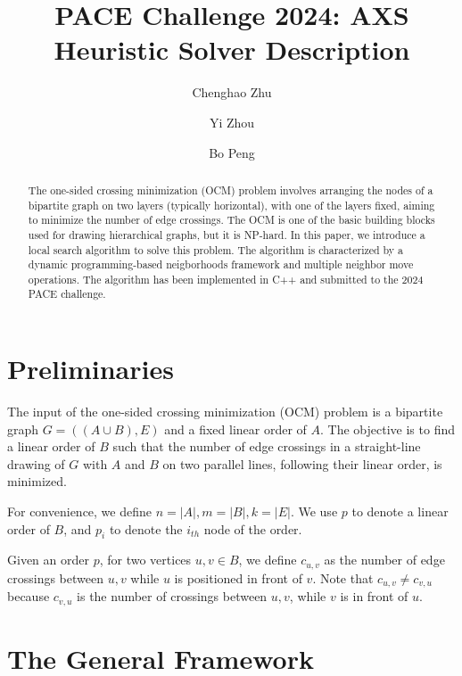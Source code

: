 \documentclass[a4paper,ctexart,UKenglish,cleveref, autoref, thm-restate]{lipics-v2021}
\title{PACE Challenge 2024: AXS Heuristic Solver Description } %
\author{Chenghao Zhu}{University of Electronic Science and Technology of China, Chengdu, China}{axs7384@gmail.com}{}{}
\author{Yi Zhou}{University of Electronic Science and Technology of China, Chengdu, China}{zhou.yi@uestc.edu.cn}{https://orcid.org/0000-0002-9023-4374}{}
\author{Bo Peng}{Southwestern University of Finance and Economics, Chengdu, China}{pengbo@swufe.edu.cn}{}{}
\begin{document}
\maketitle

\begin{abstract}
The one-sided crossing minimization (OCM) problem involves arranging the nodes of a bipartite graph on two layers (typically horizontal), with one of the layers fixed, aiming to minimize the number of edge crossings. 
The OCM is one of the basic building blocks used for drawing hierarchical graphs, but it is NP-hard.
In this paper, we introduce a local search algorithm to solve this problem. The algorithm is characterized by a dynamic programming-based neigborhoods framework and multiple neighbor move operations. The algorithm has been implemented in C++ and submitted to the 2024 PACE challenge.
\end{abstract}

\section{Preliminaries}

 The input of the one-sided crossing minimization (OCM) problem is a bipartite graph $G=((A\cup B),E)$ and a fixed linear order of $A$. The objective is to find a linear order of $B$ such that the number of edge crossings in a straight-line drawing of $G$ with $A$ and $B$ on two parallel lines, following their linear order, is minimized.

For convenience, we define $n=|A|,m=|B|,k=|E|$. We use $p$ to denote a linear order of $B$, and $p_i$ to denote the $i_{th}$ node of the order.

Given an order $p$, for two vertices $u,v\in B$, we define $c_{u,v}$ as the number of edge crossings between $u,v$ while $u$ is positioned in front of $v$. 
Note that $c_{u,v}\neq c_{v,u}$ because $c_{v,u}$ is the number of crossings between $u,v$, while $v$ is in front of $u$.

\section{The General Framework}
\end{document}
